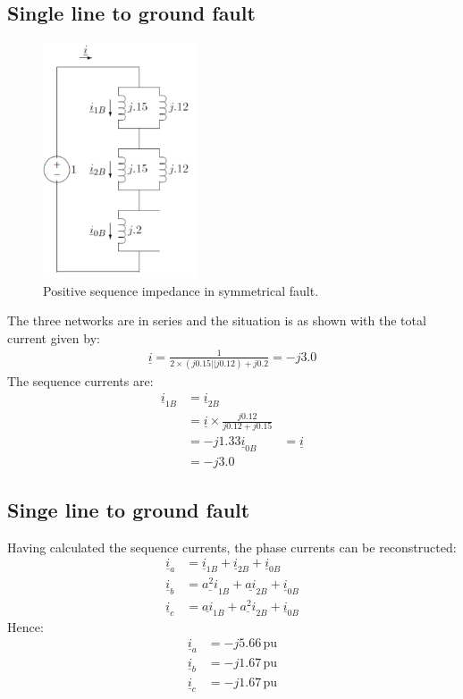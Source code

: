 \documentclass[class=report, crop=false, 12pt,a4paper]{standalone}
\begin{document}
\subsection{Single line to ground fault}
\begin{figure}[H]
	\centering
	\includegraphics[width = 0.4\textwidth]{../img/figure42.png}
	\caption{Positive sequence impedance in symmetrical fault.}
\end{figure}
The three networks are in series and the situation is as shown with the total current given by:
\begin{gather}
	\underline{i} = \frac{1}{2 \times \left(j0.15 || j0.12\right) + j0.2} = -j3.0
\end{gather}
The sequence currents are:
\begin{align}
	\underline{i}_{1B} &= \underline{i}_{2B}\\
	&= \underline{i} \times \frac{j0.12}{j0.12 + j0.15}\\
	&= -j1.33
	\underline{i}_{0B} &= \underline{i}\\
	&= -j3.0
\end{align}
\subsection{Singe line to ground fault}
Having calculated the sequence currents, the phase currents can be reconstructed:
\begin{align}
	\underline{i}_a &= \underline{i}_{1B} + \underline{i}_{2B} + \underline{i}_{0B}\\
	\underline{i}_b &= \underline{a^2i}_{1B} + \underline{ai}_{2B} + \underline{i}_{0B}\\
	\underline{i}_c &= \underline{ai}_{1B} + \underline{a^2i}_{2B} + \underline{i}_{0B}
\end{align}
Hence:
\begin{align}
	\underline{i}_a &= -j5.66\, \textrm{pu}\\
	\underline{i}_b &= -j1.67\, \textrm{pu}\\
	\underline{i}_c &= -j1.67\, \textrm{pu}
\end{align}
\end{document}
